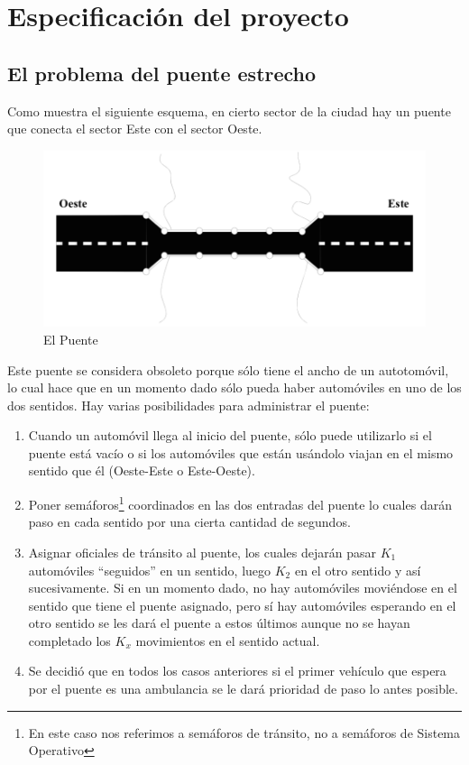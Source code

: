 \documentclass[11pt]{article}
\begin{document}
\section{Especificación del proyecto}
\subsection{El problema del puente estrecho}
Como muestra el siguiente esquema, en cierto sector de la ciudad hay un puente que conecta el sector Este con el sector Oeste.

\begin{figure}[h!]
\centering
\includegraphics[scale=0.47]{puente.png}
\caption{El Puente}
\label{puenteimg}
\end{figure}

Este puente se considera obsoleto porque sólo tiene el ancho de un autotomóvil, lo cual hace que en un momento dado sólo pueda haber automóviles en uno de los dos sentidos. Hay varias posibilidades para administrar el puente:


\begin{enumerate}
\item Cuando un automóvil llega al inicio del puente, sólo puede utilizarlo si el puente está vacío o si los automóviles que están usándolo viajan en el mismo sentido que él (Oeste-Este o Este-Oeste).

\item Poner semáforos\footnote{En este caso nos referimos a semáforos de tránsito, no a semáforos de Sistema Operativo} coordinados en las dos entradas del puente lo cuales darán paso en cada sentido por una cierta cantidad de segundos.

\item Asignar oficiales de tránsito al puente, los cuales dejarán pasar $K_1$ automóviles ``seguidos'' en un sentido, luego $K_2$ en el otro sentido y así sucesivamente. Si en un momento dado, no hay automóviles moviéndose en el sentido que tiene el puente asignado, pero sí hay automóviles esperando en el otro sentido se les dará el puente a estos últimos aunque no se hayan completado los $K_x$ movimientos en el sentido actual.

\item Se decidió que en todos los casos anteriores si el primer vehículo que
espera por el puente es una ambulancia se le dará prioridad de paso lo antes posible.

\end{enumerate}
\end{document}
